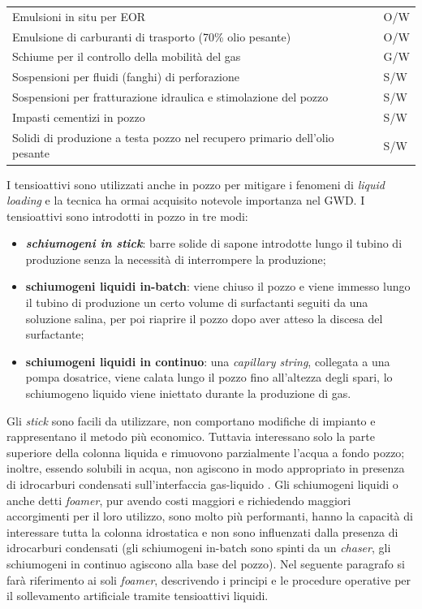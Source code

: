 \begin{table}[htbp]
\begin{tabular}{p{}p{}}
Emulsioni in situ per EOR                                                  & O/W                    \\
Emulsione di carburanti di trasporto (70\% olio pesante)                   & O/W                    \\
Schiume per il controllo della mobilità del gas                            & G/W                    \\
Sospensioni per fluidi (fanghi) di perforazione                            & S/W                    \\
Sospensioni per fratturazione idraulica e stimolazione del pozzo           & S/W                    \\
Impasti cementizi in pozzo                                                 & S/W                    \\
Solidi di produzione a testa pozzo nel recupero primario dell'olio pesante & S/W                    \\ \hline
\end{tabular}
\end{table}

I tensioattivi sono utilizzati anche in pozzo per mitigare i fenomeni di \textit{liquid loading} e la tecnica ha ormai acquisito notevole importanza nel GWD. I tensioattivi sono introdotti in pozzo in tre modi:
\begin{itemize}
    \item \textit{\textbf{schiumogeni in stick}}: barre solide di sapone introdotte lungo il tubino di produzione senza la necessità di interrompere la produzione;
    \item \textbf{schiumogeni liquidi in-batch}: viene chiuso il pozzo e viene immesso lungo il tubino di produzione un certo volume di surfactanti seguiti da una soluzione salina, per poi riaprire il pozzo dopo aver atteso la discesa del surfactante;
    \item \textbf{schiumogeni liquidi in continuo}: una \textit{capillary string}, collegata a una pompa dosatrice, viene calata lungo il pozzo fino all'altezza degli spari, lo schiumogeno liquido viene iniettato durante la produzione di gas.
\end{itemize}
 Gli \textit{stick} sono facili da utilizzare, non comportano modifiche di impianto e rappresentano il metodo più economico. Tuttavia interessano solo la parte superiore della colonna liquida e rimuovono parzialmente l'acqua a fondo pozzo; inoltre, essendo solubili in acqua, non agiscono in modo appropriato in presenza di idrocarburi condensati sull'interfaccia gas-liquido \parencite{bolding2007resurrecting}. Gli schiumogeni liquidi o anche detti \textit{foamer}, pur avendo costi maggiori e richiedendo maggiori accorgimenti per il loro utilizzo, sono molto più performanti, hanno la capacità di interessare tutta la colonna idrostatica e non sono influenzati dalla presenza di idrocarburi condensati (gli schiumogeni in-batch sono spinti da un \textit{chaser}, gli schiumogeni in continuo agiscono alla base del pozzo). Nel seguente paragrafo si farà riferimento ai soli \textit{foamer}, descrivendo i principi e le procedure operative per il sollevamento artificiale tramite tensioattivi liquidi.
 
